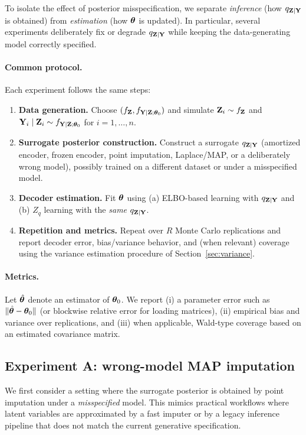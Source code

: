 \documentclass[twoside,11pt]{article}
\begin{document}
To isolate the effect of posterior misspecification, we separate \emph{inference} (how $q_{{\bf Z}\mid{\bf Y}}$ is obtained) from \emph{estimation} (how ${\bm{\theta}}$ is updated).  In particular, several experiments deliberately fix or degrade $q_{{\bf Z}\mid{\bf Y}}$ while keeping the data-generating model correctly specified.

\paragraph{Common protocol.}
Each experiment follows the same steps:
\begin{enumerate}
\item \textbf{Data generation.} Choose $(f_{\bf Z}, f_{{\bf Y}\mid{\bf Z};{\bm{\theta}}_0})$ and simulate ${\bf Z}_i \sim f_{\bf Z}$ and ${\bf Y}_i\mid{\bf Z}_i \sim f_{{\bf Y}\mid{\bf Z};{\bm{\theta}}_0}$ for $i=1,\dots,n$.
\item \textbf{Surrogate posterior construction.} Construct a surrogate $q_{{\bf Z}\mid{\bf Y}}$ (amortized encoder, frozen encoder, point imputation, Laplace/MAP, or a deliberately wrong model), possibly trained on a different dataset or under a misspecified model.
\item \textbf{Decoder estimation.} Fit ${\bm{\theta}}$ using (a) ELBO-based learning with $q_{{\bf Z}\mid{\bf Y}}$ and (b) $Z_q$ learning with the \emph{same} $q_{{\bf Z}\mid{\bf Y}}$.
\item \textbf{Repetition and metrics.} Repeat over $R$ Monte Carlo replications and report decoder error, bias/variance behavior, and (when relevant) coverage using the variance estimation procedure of Section~\ref{sec:variance}.
\end{enumerate}

\paragraph{Metrics.}
Let $\hat{{\bm{\theta}}}$ denote an estimator of ${\bm{\theta}}_0$.  We report (i) a parameter error such as $\|\hat{{\bm{\theta}}}-{\bm{\theta}}_0\|$ (or blockwise relative error for loading matrices), (ii) empirical bias and variance over replications, and (iii) when applicable, Wald-type coverage based on an estimated covariance matrix.


\subsection{Experiment A: wrong-model MAP imputation}
\label{sec:simA}

We first consider a setting where the surrogate posterior is obtained by point imputation under a \emph{misspecified} model.  This mimics practical workflows where latent variables are approximated by a fast imputer or by a legacy inference pipeline that does not match the current generative specification.
\end{document}
